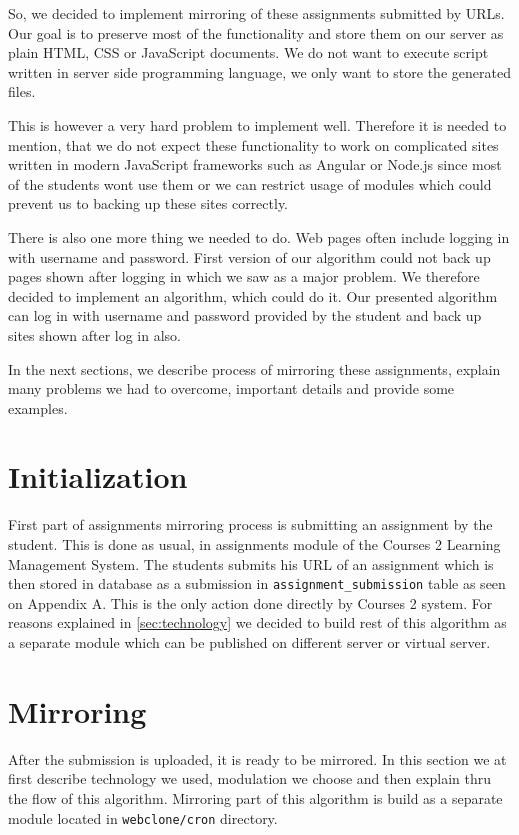 So, we decided to implement mirroring of these assignments submitted by URLs. Our goal is to preserve most of the functionality and store them on our server as plain HTML, CSS or JavaScript documents. We do not want to execute script written in server side programming language, we only want to store the generated files.

This is however a very hard problem to implement well. Therefore it is needed to mention, that we do not expect these functionality to work on complicated sites written in modern JavaScript frameworks such as Angular or Node.js since most of the students wont use them or we can restrict usage of modules which could prevent us to backing up these sites correctly.

There is also one more thing we needed to do. Web pages often include logging in with username and password. First version of our algorithm could not back up pages shown after logging in which we saw as a major problem. We therefore decided to implement an algorithm, which could do it. Our presented algorithm can log in with username and password provided by the student and back up sites shown after log in also.

In the next sections, we describe process of mirroring these assignments, explain many problems we had to overcome, important details and provide some examples.

\section{Initialization}
First part of assignments mirroring process is submitting an assignment by the student. This is done as usual, in assignments module of the Courses 2 Learning Management System. The students submits his URL of an assignment which is then stored in database as a submission in \texttt{assignment\_submission} table as seen on Appendix A. This is the only action done directly by Courses 2 system. For reasons explained in \ref{sec:technology} we decided to build rest of this algorithm as a separate module which can be published on different server or virtual server.

\section{Mirroring}
After the submission is uploaded, it is ready to be mirrored. In this section we at first describe technology we used, modulation we choose and then explain thru the flow of this algorithm. Mirroring part of this algorithm is build as a separate module located in \texttt{webclone/cron} directory.

